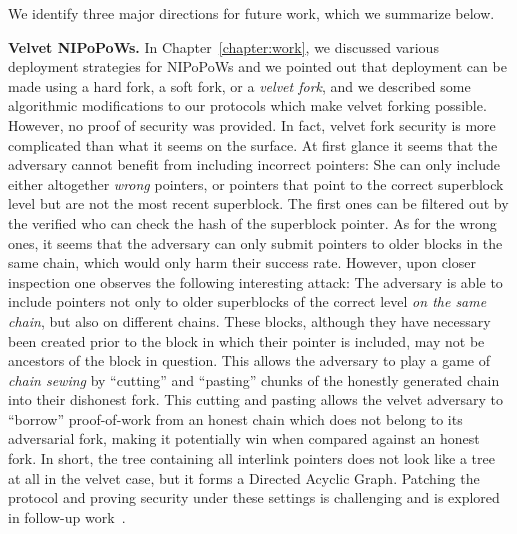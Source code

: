 We identify three major directions for future work, which we summarize below.

\textbf{Velvet NIPoPoWs.} In Chapter~\ref{chapter:work}, we discussed various
deployment strategies for NIPoPoWs and we pointed out that deployment can be
made using a hard fork, a soft fork, or a \emph{velvet fork}, and we described
some algorithmic modifications to our protocols which make velvet forking
possible. However, no proof of security was provided. In fact, velvet fork
security is more complicated than what it seems on the surface. At first
glance it seems that the adversary cannot benefit from including incorrect
pointers: She can only include either altogether \emph{wrong} pointers, or
pointers that point to the correct superblock level but are not the most recent
superblock. The first ones can be filtered out by the verified who can check the
hash of the superblock pointer. As for the wrong ones, it seems that the
adversary can only submit pointers to older blocks in the same chain, which
would only harm their success rate. However, upon closer inspection one observes
the following interesting attack: The adversary is able to include pointers not
only to older superblocks of the correct level \emph{on the same chain}, but
also on different chains. These blocks, although they have necessary been
created prior to the block in which their pointer is included, may not be
ancestors of the block in question. This allows the adversary to play a game of
\emph{chain sewing} by ``cutting'' and ``pasting'' chunks of the honestly
generated chain into their dishonest fork. This cutting and pasting allows the
velvet adversary to ``borrow'' proof-of-work from an honest chain which does not
belong to its adversarial fork, making it potentially win when compared against
an honest fork. In short, the tree containing all interlink pointers does not
look like a tree at all in the velvet case, but it forms a Directed Acyclic
Graph. Patching the protocol and proving security under these settings is
challenging and is explored in follow-up work~\cite{velvet-nipopows}.

